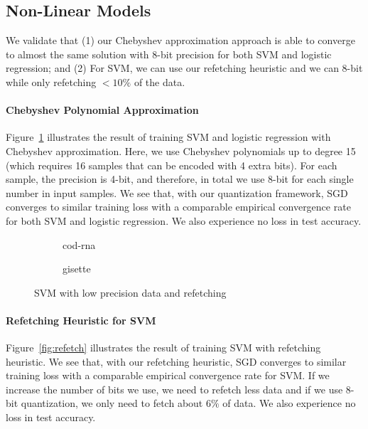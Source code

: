 \documentclass{article}
\begin{document}
\subsection{Non-Linear Models}

We validate that (1) our Chebyshev 
approximation approach is able to
converge to almost the same solution 
with 8-bit precision for both SVM
and logistic regression;
and (2) For SVM, we can use our refetching heuristic and we can 
8-bit while only refetching $<10\%$ of the data.

\paragraph{Chebyshev Polynomial Approximation}


Figure~\ref{fig:chebyshev} illustrates
the result of training SVM
and logistic regression 
with Chebyshev approximation. Here,
we use Chebyshev polynomials up to
degree 15 (which requires 16 samples
that can be encoded with 4 extra 
bits). For each sample, the precision
is 4-bit, and therefore, in total
we use 8-bit for each single number
in input samples. We see that, 
with our quantization framework,
SGD converges to similar training loss 
with a comparable empirical convergence 
rate for both SVM and logistic regression.
We also experience no loss in test accuracy.
\begin{figure}[t]
\centering
    \begin{subfigure}[h]{.4\columnwidth}
    \caption{cod-rna}
    \end{subfigure}
    \begin{subfigure}[h]{.4\columnwidth}
    \caption{gisette}
    \end{subfigure}
    
\caption{SVM with low precision data and refetching}
\label{fig:chebyshev}
\end{figure}

\paragraph{Refetching Heuristic for SVM}

Figure~\ref{fig:refetch} illustrates
the result of training SVM
with refetching heuristic. 
We see that, 
with our refetching heuristic,
SGD converges to similar training loss 
with a comparable empirical convergence 
rate for SVM. If we increase the number of
bits we use, we need to refetch less data and
if we use 8-bit quantization, we only need to fetch
about $6\%$ of data.
We also experience no loss in test accuracy.
\end{document}
